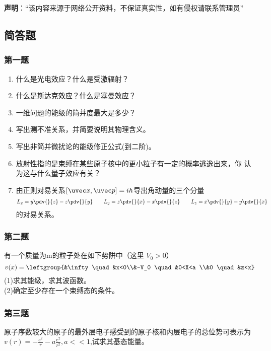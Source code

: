 

\textbf{声明}：“该内容来源于网络公开资料，不保证真实性，如有侵权请联系管理员”

\subsection{简答题}
\subsubsection{第一题}
\begin{enumerate}
\item 什么是光电效应？什么是受激辐射？
\item 什么是斯达克效应？什么是塞曼效应？
\item 一维问题的能级的简并度最大是多少？
\item 写出测不准关系，并简要说明其物理含义。
\item 写出非简并微扰论的能级修正公式(到二阶)。
\item 放射性指的是束缚在某些原子核中的更小粒子有一定的概率逃逸出来，你
认为这与什么量子效应有关？
\item 由正则对易关系$[\uvec x,\uvec p]=ih$导出角动量的三个分量
\begin{equation}
L_x=y\pdv{}{z}-z\pdv{}{y} \qquad L_y=z\pdv{}{x}-x\pdv{}{z} \qquad L_z=x\pdv{}{y}-y\pdv{}{x}~
\end{equation}
的对易关系。
\end{enumerate}
\subsubsection{第二题}
有一个质量为m的粒子处在如下势阱中（这里 $V_0>0$）
\begin{equation}
v(x)=\leftgroup{&\infty   \quad &x<0\\&-V_0 \quad &0<X<a \\&0 \quad &z<x}~
\end{equation}
(1)求其能级，求其波函数。\\
(2)确定至少存在一个束缚态的条件。
\subsubsection{第三题}
原子序数较大的原子的最外层电子感受到的原子核和内层电子的总位势可表示为$v(r)=-\frac{e^2}{r}-a\frac{e^2}{r^2},a<<1$,试求其基态能量。
